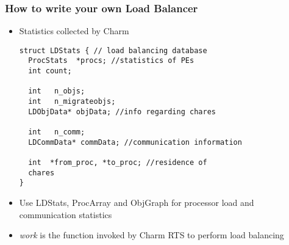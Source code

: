 \begin{frame}[fragile]
\frametitle{How to write your own Load Balancer}
\begin{itemize}
\item Statistics collected by Charm
\begin{lstlisting}[basicstyle=\tiny]
struct LDStats { // load balancing database
  ProcStats  *procs; //statistics of PEs
  int count;

  int   n_objs;
  int   n_migrateobjs;
  LDObjData* objData; //info regarding chares

  int   n_comm;
  LDCommData* commData; //communication information

  int  *from_proc, *to_proc; //residence of
  chares
}
\end{lstlisting}
\item Use LDStats, ProcArray and ObjGraph for processor load and communication
statistics
\item \emph{work} is the function invoked by Charm RTS to perform load balancing
\end{itemize}
\end{frame}
